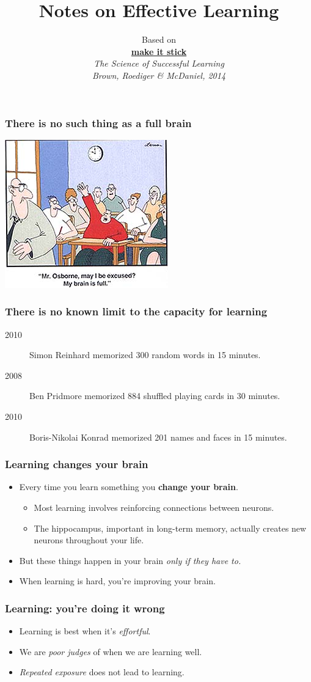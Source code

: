 \documentclass{beamer}
\title{Notes on Effective Learning}
\author{Based on\\
\href{http://makeitstick.net/}{\bf make it stick}\\
\em The Science of Successful Learning
\\\small Brown, Roediger \& McDaniel, 2014}
\newcommand{\bi}{\begin{itemize}}
\newcommand{\li}{\item}
\newcommand{\ei}{\end{itemize}}
\newcommand{\bfr}[1]{\begin{frame}[fragile]\frametitle{{ #1 }}}
\begin{document}
\begin{frame}
\maketitle

\end{frame}



\bfr{There is no such thing as a full brain}
\begin{center}
\includegraphics[height=0.7\textheight]{brainisfull.jpg}
\end{center}
\end{frame}

\bfr{There is no known limit to the capacity for learning}
\begin{description}
\li[2010] Simon Reinhard memorized 300 random words in 15 minutes.
\li[2008] Ben Pridmore memorized 884 shuffled playing cards in 30 minutes. 
\li[2010] Boris-Nikolai Konrad memorized 201 names and faces in 15 minutes.
\end{description}

\end{frame}

\bfr{Learning changes your brain}
\bi
\li Every time you learn something you {\bf change your brain}.
\bi
\li Most learning involves reinforcing connections between neurons.
\li The hippocampus, important in
long-term memory, actually creates new neurons throughout your life.
\ei
\li But these things happen in your brain {\em only if they have to.}
\li When learning is hard, you're improving your brain.
\ei
\end{frame}

\bfr{Learning: you're doing it wrong}
\bi
\li Learning is best when it's {\em effortful}.
\li We are {\em poor judges} of when we are learning well.
\li {\em Repeated exposure} does not lead to learning.
\ei
\end{frame}
\end{document}
